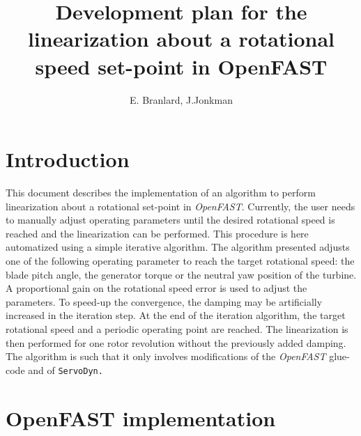 \documentclass[11pt]{article}
\begin{document}
\title{Development plan for the linearization about a rotational speed set-point in OpenFAST}
\author{E. Branlard, J.Jonkman}
\maketitle

\section*{Introduction}
This document describes the implementation of an algorithm to perform %
linearization about a rotational set-point in \textit{OpenFAST}. Currently, the user needs to manually adjust operating parameters until the desired rotational speed is reached and the linearization can be performed. This procedure is here automatized using a simple iterative algorithm. The algorithm presented adjusts one of the following operating parameter to reach the target rotational speed: the blade pitch angle, the generator torque or the neutral yaw position of the turbine. A proportional gain on the rotational speed error is used to adjust the parameters. To speed-up the convergence, the damping may be artificially increased in the iteration step. At the end of the iteration algorithm, the target rotational speed and a periodic operating point are reached. The linearization is then performed for one rotor revolution without the previously added damping.
The algorithm is such that it only involves modifications of the \textit{OpenFAST} glue-code and of \tt{ServoDyn}.


\section{OpenFAST implementation}
\end{document}
